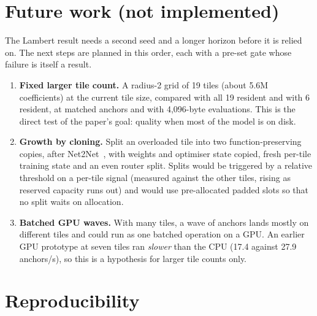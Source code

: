 \documentclass[10pt]{article}
\begin{document}
\section{Future work (not implemented)}
\label{sec:future}

The Lambert result needs a second seed and a longer horizon before it is relied on. The next steps are planned
in this order, each with a pre-set gate whose failure is itself a result.
\begin{enumerate}[leftmargin=*,itemsep=0pt,topsep=2pt]
\item \textbf{Fixed larger tile count.} A radius-2 grid of 19 tiles (about 5.6M coefficients) at the
current tile size, compared with all 19 resident and with 6 resident, at matched anchors and with
4,096-byte evaluations. This is the direct test of the paper's goal: quality when most of the model
is on disk.
\item \textbf{Growth by cloning.} Split an overloaded tile into two function-preserving copies, after
Net2Net~\citep{chen2016net2net}, with weights and optimiser state copied, fresh per-tile training state
and an even router split. Splits would be triggered by a relative threshold on a per-tile signal
(measured against the other tiles, rising as reserved capacity runs out) and would use pre-allocated
padded slots so that no split waits on allocation.
\item \textbf{Batched GPU waves.} With many tiles, a wave of anchors lands mostly on different tiles
and could run as one batched operation on a GPU. An earlier GPU prototype at seven tiles ran
\emph{slower} than the CPU (17.4 against 27.9 anchors/s), so this is a hypothesis for larger tile
counts only.
\end{enumerate}

\section{Reproducibility}
\label{sec:repro}
\end{document}
